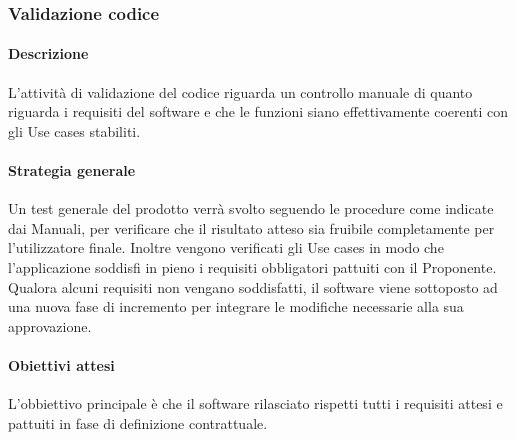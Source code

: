 	\subsubsection{Validazione codice}
	
	\paragraph{Descrizione}
	L’attività di validazione del codice riguarda un controllo manuale di quanto riguarda i requisiti del software e che le funzioni siano effettivamente coerenti con gli Use cases stabiliti.
	
	\paragraph{Strategia generale}
	Un test generale del prodotto verrà svolto seguendo le procedure come indicate dai Manuali, per verificare che il risultato atteso sia fruibile completamente per l'utilizzatore finale. Inoltre vengono verificati gli Use cases in modo che l'applicazione soddisfi in pieno i requisiti obbligatori pattuiti con il Proponente. Qualora alcuni requisiti non vengano soddisfatti, il software viene sottoposto ad una nuova fase di incremento per integrare le modifiche necessarie alla sua approvazione.
	
	\paragraph{Obiettivi attesi}
	L'obbiettivo principale è che il software rilasciato rispetti tutti i requisiti attesi e pattuiti in fase di definizione contrattuale.